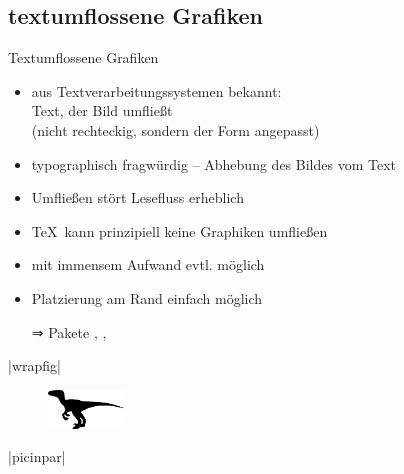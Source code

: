\documentclass[
	vorläufig=true,
	datum=2017-11-24,
	titel={Grafiken, Abbildungen, TikZ},
	web=true,
	mo,
]{../tex/latexkurs-slides}
\begin{document}
\subsection{textumflossene Grafiken}
\begin{frame}[fragile]{Textumflossene Grafiken}
	\begin{itemize}
		\item aus Textverarbeitungssystemen bekannt:\\%
		Text, der Bild umfließt\\(nicht rechteckig, sondern der Form angepasst)
		\item typographisch fragwürdig – Abhebung des Bildes vom Text
		\item Umfließen stört Lesefluss erheblich
		\item \TeX\ kann prinzipiell keine Graphiken umfließen
		\item mit immensem Aufwand evtl. möglich
		\item Platzierung am Rand einfach möglich
		\item[⇒] Pakete , , 
	\end{itemize}
\end{frame}

\begin{frame}[fragile]{|wrapfig|}
\begin{LTXexample}[preset=\fontsize{4}{5}\selectfont,pos=b]
\blindtext
\begin{figure}
  \includegraphics[width=2cm]{05_raptor.pdf}
\end{figure}
\blindtext[3]
\end{LTXexample}
\end{frame}

\begin{frame}[fragile]{|picinpar|}
\begin{LTXexample}[preset=\fontsize{4}{5}\selectfont,pos=b]
\begin{window}
  \blindtext[4]
\end{window}
\end{LTXexample}
\end{frame}
\end{document}
